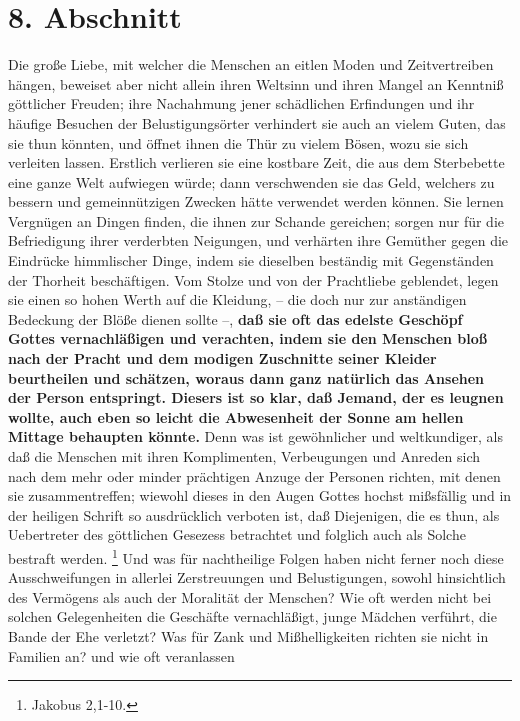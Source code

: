 \section{8. Abschnitt} \label{kap15_ab8}

Die große Liebe, mit welcher die Menschen an eitlen Moden und Zeitvertreiben
hängen, beweiset aber nicht allein ihren Weltsinn und ihren Mangel an Kenntniß
göttlicher Freuden; ihre Nachahmung jener schädlichen Erfindungen und ihr
häufige Besuchen der Belustigungsörter verhindert sie auch an vielem Guten, das
sie thun könnten, und öffnet ihnen die Thür zu vielem Bösen, wozu sie sich
verleiten lassen. Erstlich verlieren sie eine kostbare Zeit, die aus dem
Sterbebette eine ganze Welt aufwiegen würde; dann verschwenden sie das Geld,
welchers zu bessern und gemeinnützigen Zwecken hätte verwendet werden können.
Sie lernen Vergnügen an Dingen finden, die ihnen zur Schande gereichen; sorgen
nur für die Befriedigung ihrer verderbten Neigungen, und verhärten ihre Gemüther
gegen die Eindrücke himmlischer Dinge, indem sie dieselben beständig mit
Gegenständen der Thorheit beschäftigen. Vom Stolze und von der Prachtliebe
geblendet, legen sie einen so hohen Werth auf die Kleidung, -- die doch nur zur
anständigen Bedeckung der Blöße dienen sollte --, \textbf{daß sie oft das edelste
Geschöpf Gottes vernachläßigen und verachten, indem sie den Menschen bloß nach
der Pracht und dem modigen Zuschnitte seiner Kleider beurtheilen und schätzen,
woraus dann ganz natürlich das Ansehen der Person entspringt. Diesers ist so
klar, daß Jemand, der es leugnen wollte, auch eben so leicht die Abwesenheit der
Sonne am hellen Mittage behaupten könnte.} Denn was ist gewöhnlicher und
weltkundiger, als daß die Menschen mit ihren Komplimenten, Verbeugungen und
Anreden sich nach dem mehr oder minder prächtigen Anzuge der Personen richten,
mit denen sie zusammentreffen; wiewohl dieses in den Augen Gottes hochst
mißsfällig und in der heiligen Schrift so ausdrücklich verboten ist, daß
Diejenigen, die es thun, als Uebertreter des göttlichen Gesezess betrachtet und
folglich auch als Solche bestraft werden.
\footnote{Jakobus 2,1-10.}
Und was für nachtheilige
Folgen haben nicht ferner noch diese Ausschweifungen in allerlei Zerstreuungen
und Belustigungen, sowohl hinsichtlich des Vermögens als auch der Moralität der
Menschen? Wie oft werden nicht bei solchen Gelegenheiten die Geschäfte
vernachläßigt, junge Mädchen verführt, die Bande der Ehe verletzt? Was für Zank
und Mißhelligkeiten richten sie nicht in Familien an? und wie oft veranlassen
